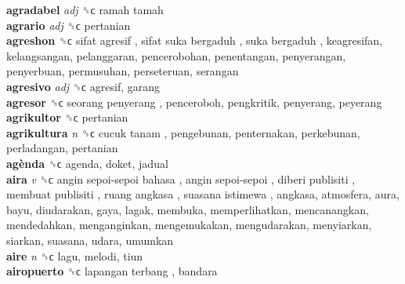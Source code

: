 \textbf{agradabel} \emph{adj}  ␝ϲ   ramah tamah   \\
\textbf{agrario} \emph{adj}  ␝ϲ  pertanian  \\
\textbf{agreshon} ␝ϲ   sifat agresif ,  sifat suka bergaduh ,  suka bergaduh , keagresifan, kelangsangan, pelanggaran, pencerobohan, penentangan, penyerangan, penyerbuan, permusuhan, perseteruan, serangan  \\
\textbf{agresivo} \emph{adj}  ␝ϲ  agresif, garang  \\
\textbf{agresor} ␝ϲ   seorang penyerang , penceroboh, pengkritik, penyerang, peyerang  \\
\textbf{agrikultor} ␝ϲ  pertanian  \\
\textbf{agrikultura} \emph{n}  ␝ϲ   cucuk tanam , pengebunan, penternakan, perkebunan, perladangan, pertanian  \\
\textbf{agènda} ␝ϲ  agenda, doket, jadual  \\
\textbf{aira} \emph{v}  ␝ϲ   angin sepoi-sepoi bahasa ,  angin sepoi-sepoi ,  diberi publisiti ,  membuat publisiti ,  ruang angkasa ,  suasana istimewa , angkasa, atmosfera, aura, bayu, diudarakan, gaya, lagak, membuka, memperlihatkan, mencanangkan, mendedahkan, menganginkan, mengemukakan, mengudarakan, menyiarkan, siarkan, suasana, udara, umumkan  \\
\textbf{aire} \emph{n}  ␝ϲ  lagu, melodi, tiun  \\
\textbf{airopuerto} ␝ϲ   lapangan terbang , bandara  \\
